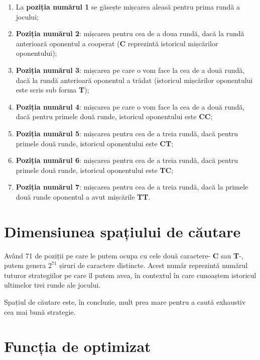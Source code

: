 \begin{enumerate}
	
	\item La \textbf{poziția numărul 1} se găsește mișcarea aleasă pentru prima rundă a jocului;
	
	\item \textbf{Poziția numărul 2}: mișcarea pentru cea de a doua rundă, dacă la rundă anterioară oponentul a cooperat (\textbf{C} reprezintă istoricul mișcărilor oponentului);
	
	\item \textbf{Poziția numărul 3}: mișcarea pe care o vom face la cea de a două rundă, dacă la rundă anterioară oponentul a trădat (istoricul mișcărilor oponentului este scris sub forma \textbf{T});
	
	\item \textbf{Poziția numărul 4}: mișcarea pe care o vom face la cea de a două rundă, dacă pentru primele două runde, istoricul oponentului este \textbf{CC};
	
	\item \textbf{Poziția numărul 5}: mișcarea pentru cea de a treia rundă, dacă pentru primele două runde, istoricul oponentului este \textbf{CT};
	
	\item \textbf{Poziția numărul 6}: mișcarea pentru cea de a treia rundă, dacă pentru primele două runde, istoricul oponentului este \textbf{TC};
	
	\item \textbf{Poziția numărul 7}: mișcarea pentru cea de a treia rundă, dacă la primele două runde oponentul a avut mișcările \textbf{TT}.
	
\end{enumerate}

\section{Dimensiunea spațiului de căutare}

Având 71 de poziții pe care le putem ocupa cu cele două caractere- \textbf{C} sau \textbf{T}-, putem genera $2^{71}$ șiruri de caractere distincte. Acest număr reprezintă numărul tuturor strategiilor pe care îl putem avea, în contextul în care cunoaștem istoricul ultimelor trei runde ale jocului.  

Spațiul de căutare este, în concluzie, mult prea mare pentru a caută exhaustiv cea mai bună strategie.

\section{Funcția de optimizat}

